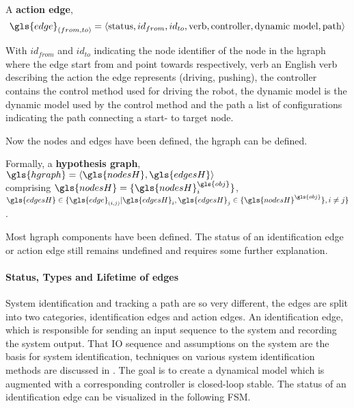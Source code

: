 A \textbf{action edge}, \[\gls{edge}_{(from, to)} = \left\langle \textrm{status}, id_{from}, id_{to}, \textrm{verb}, \textrm{controller},\textrm{dynamic model}, \textrm{path}\right\rangle\]\bs

With $id_{from}$ and $id_{to}$ indicating the node identifier of the node in the \ac{hgraph} where the edge start from and point towards respectively, verb an English verb describing the action the edge represents (driving, pushing), the controller contains the control method used for driving the robot, the dynamic model is the dynamic model used by the control method and the path a list of configurations indicating the path connecting a start- to target node.\bs

Now the nodes and edges have been defined, the \ac{hgraph} can be defined.\bs

Formally, a \textbf{hypothesis graph}, $\gls{hgraph} = \left\langle \gls{nodesH}, \gls{edgesH} \right\rangle $
\\comprising $\gls{nodesH} = \{\gls{nodesH}^{\gls{obj}}_{i}\}$, \quad $\gls{edgesH} \in \{\gls{edge}_{(i,j)}| \gls{edgesH}_i, \gls{edgesH}_j \in \{\gls{nodesH}^{\gls{obj}} \}, i \neq j\}$.\bs

Most \ac{hgraph} components have been defined. The status of an identification edge or action edge still remains undefined and requires some further explanation.\bs

\paragraph{Status, Types and Lifetime of edges}
System identification and tracking a path are so very different, the edges are split into two categories, identification edges and action edges. An identification edge, which is responsible for sending an input sequence to the system and recording the system output. That \ac{IO} sequence and assumptions on the system are the basis for system identification, techniques on various system identification methods are discussed in . The goal is to create a dynamical model which is augmented with a corresponding controller is closed-loop stable. The status of an identification edge can be visualized in the following \ac{FSM}.\bs

